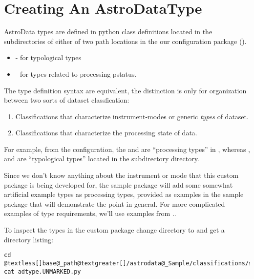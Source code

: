 \documentclass[letterpaper,10pt,english]{sphinxmanual}
\begin{document}
\section{Creating An AstroDataType}
\label{creatingAnAstroDataType:creating-an-astrodatatype}\label{creatingAnAstroDataType::doc}
AstroData types are defined in python class definitions located in the
subdirectories of either of two path locations in the our configuration package
().
\begin{itemize}
\item {} 
 - for typological types

\item {} 
 - for types related to processing pstatus.

\end{itemize}

The type definition syntax are equivalent,
the distinction is only for organization between two
sorts of dataset classfication:
\begin{enumerate}
\item {} 
Classifications that characterize instrument-modes or generic \emph{types}
of dataset.

\item {} 
Classifications that characterize the processing state of data.

\end{enumerate}

For example, from the  configuration, the  and
 are ``processing types'' in , whereas
,  and  are ``typological types'' located in the
 subdirectory directory.

Since we don't know anything about the instrument or mode that this  custom package is
being developed for, the sample package will add some somewhat artificial example types
as processing types,  provided as examples in the sample package that will demonstrate
the point in general. For more complicated examples of type requirements, we'll
use examples from ..

To inspect the types in the custom package change
directory to  and get a directory
listing:

\begin{Verbatim}[commandchars=@\[\]]
cd @textless[]base@_path@textgreater[]/astrodata@_Sample/classifications/status
cat adtype.UNMARKED.py
\end{Verbatim}
\end{document}
